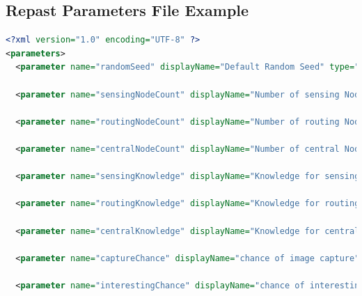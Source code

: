 \begin{appendices}
\chapter{Repast Parameters File Example}\label{appendix:sims:params}
\begin{lstlisting}[language=XML, caption={Example params.xml file for a Repast simulation}]
<?xml version="1.0" encoding="UTF-8" ?>
<parameters>
  <parameter name="randomSeed" displayName="Default Random Seed" type="int" defaultValue="__NULL__" />
  
  <parameter name="sensingNodeCount" displayName="Number of sensing Nodes" type="int" defaultValue="20" isReadOnly="false" converter="repast.simphony.parameter.StringConverterFactory$IntConverter"  />

  <parameter name="routingNodeCount" displayName="Number of routing Nodes" type="int" defaultValue="4" isReadOnly="false" converter="repast.simphony.parameter.StringConverterFactory$IntConverter" />
  
  <parameter name="centralNodeCount" displayName="Number of central Nodes" type="int" defaultValue="1" isReadOnly="false" converter="repast.simphony.parameter.StringConverterFactory$IntConverter" />
  
  <parameter name="sensingKnowledge" displayName="Knowledge for sensing nodes" type="java.lang.String" defaultValue="MK" isReadOnly="false" converter="repast.simphony.parameter.StringConverterFactory$StringStringConverter"/>

  <parameter name="routingKnowledge" displayName="Knowledge for routing nodes" type="java.lang.String" defaultValue="MK" isReadOnly="false" converter="repast.simphony.parameter.StringConverterFactory$StringStringConverter"/>
  
  <parameter name="centralKnowledge" displayName="Knowledge for central nodes" type="java.lang.String" defaultValue="NK" isReadOnly="false" converter="repast.simphony.parameter.StringConverterFactory$StringStringConverter"/>
  
  <parameter name="captureChance" displayName="chance of image capture" type="double" defaultValue="0.000857703189" isReadOnly="false" converter="repast.simphony.parameter.StringConverterFactory$DoubleConverter"/>
  
  <parameter name="interestingChance" displayName="chance of interesting capture" type="double" defaultValue="0.207" isReadOnly="false" converter="repast.simphony.parameter.StringConverterFactory$DoubleConverter"/>
  

\end{lstlisting}
\end{appendices}

